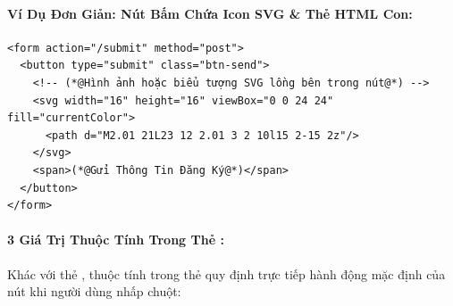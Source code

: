 \paragraph{Ví Dụ Đơn Giản: Nút Bấm Chứa Icon SVG \& Thẻ HTML Con:}

\begin{codeWindow}
\begin{lstlisting}[language=HTML5]
<form action="/submit" method="post">
  <button type="submit" class="btn-send">
    <!-- (*@Hình ảnh hoặc biểu tượng SVG lồng bên trong nút@*) -->
    <svg width="16" height="16" viewBox="0 0 24 24" fill="currentColor">
      <path d="M2.01 21L23 12 2.01 3 2 10l15 2-15 2z"/>
    </svg>
    <span>(*@Gửi Thông Tin Đăng Ký@*)</span>
  </button>
</form>
\end{lstlisting}
\end{codeWindow}

\begin{browserWindow}
\sffamily\small
{}
\end{browserWindow}

\paragraph{3 Giá Trị Thuộc Tính  Trong Thẻ :}

Khác với thẻ , thuộc tính  trong thẻ  quy định trực tiếp hành động mặc định của nút khi người dùng nhấp chuột:

